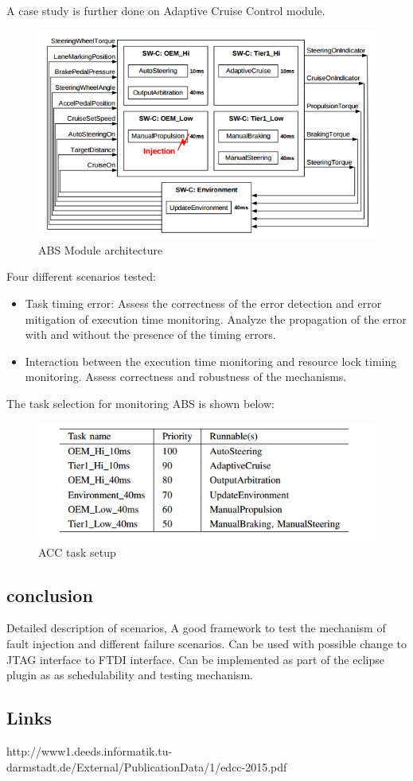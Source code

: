 A case study is further done on Adaptive Cruise Control module. 
\begin{figure}[H]
	\centering
	\includegraphics[width=400pt]{Pictures/ABS}
	\caption{ABS Module architecture}\label{abs}
\end{figure}


Four different scenarios tested:
\begin{itemize}
	\item Task timing error: Assess the correctness of the error detection and error mitigation of execution time monitoring. Analyze the propagation of the error with and without the presence of the timing errors.
	\item Interaction between the execution time monitoring and resource lock timing monitoring. Assess correctness and robustness of the mechanisms.
\end{itemize}

The task selection for monitoring ABS is shown below:
\begin{figure}[H]
	\centering
	\includegraphics[width=400pt]{Pictures/Task}
	\caption{ACC task setup}\label{abs}
\end{figure}
\subsection{conclusion} %
Detailed description of scenarios, A good framework to test the mechanism of fault injection and different failure scenarios.
Can be used with possible change to JTAG interface to FTDI interface. Can be implemented as part of the eclipse plugin as as schedulability and testing mechanism.

\subsection{Links}
http://www1.deeds.informatik.tu-darmstadt.de/External/PublicationData/1/edcc-2015.pdf

